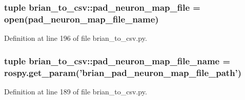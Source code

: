 \subsubsection[{pad\-\_\-neuron\-\_\-map\-\_\-file}]{\setlength{\rightskip}{0pt plus 5cm}tuple {\bf brian\-\_\-to\-\_\-csv\-::pad\-\_\-neuron\-\_\-map\-\_\-file} = open({\bf pad\-\_\-neuron\-\_\-map\-\_\-file\-\_\-name})}\label{namespacebrian__to__csv_a4b3dc32d11a9a638dfddb7f799bcdd76}


\-Definition at line 196 of file brian\-\_\-to\-\_\-csv.\-py.

\subsubsection[{pad\-\_\-neuron\-\_\-map\-\_\-file\-\_\-name}]{\setlength{\rightskip}{0pt plus 5cm}tuple {\bf brian\-\_\-to\-\_\-csv\-::pad\-\_\-neuron\-\_\-map\-\_\-file\-\_\-name} = rospy.\-get\-\_\-param('brian\-\_\-pad\-\_\-neuron\-\_\-map\-\_\-file\-\_\-path')}\label{namespacebrian__to__csv_a82603e0870888b85fe1851ef75cb497c}


\-Definition at line 189 of file brian\-\_\-to\-\_\-csv.\-py.

